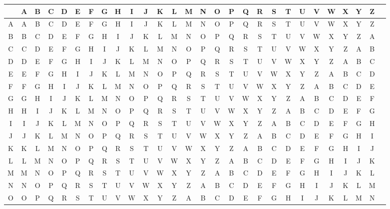 \documentclass[12pt]{article}
\begin{document}
\begin{figure}[ht]
\begin{adjustbox}{max width=\textwidth}
	\begin{tabular}{| c || c | c | c | c | c | c | c | c | c | c | c | c | c | c | c | c | c | c | c | c | c | c | c | c | c | c | c |}
		\hline
		 & A & B & C & D & E & F & G & H & I & J & K & L & M & N & O & P & Q & R & S & T & U & V & W & X & Y & Z \\
		\hline\hline
A & A & B & C & D & E & F & G & H & I & J & K & L & M & N & O & P & Q & R & S & T & U & V & W & X & Y & Z \\ \hline
B & B & C & D & E & F & G & H & I & J & K & L & M & N & O & P & Q & R & S & T & U & V & W & X & Y & Z & A \\ \hline
C & C & D & E & F & G & H & I & J & K & L & M & N & O & P & Q & R & S & T & U & V & W & X & Y & Z & A & B \\ \hline
D & D & E & F & G & H & I & J & K & L & M & N & O & P & Q & R & S & T & U & V & W & X & Y & Z & A & B & C \\ \hline
E & E & F & G & H & I & J & K & L & M & N & O & P & Q & R & S & T & U & V & W & X & Y & Z & A & B & C & D \\ \hline
F & F & G & H & I & J & K & L & M & N & O & P & Q & R & S & T & U & V & W & X & Y & Z & A & B & C & D & E \\ \hline
G & G & H & I & J & K & L & M & N & O & P & Q & R & S & T & U & V & W & X & Y & Z & A & B & C & D & E & F \\ \hline
H & H & I & J & K & L & M & N & O & P & Q & R & S & T & U & V & W & X & Y & Z & A & B & C & D & E & F & G \\ \hline
I & I & J & K & L & M & N & O & P & Q & R & S & T & U & V & W & X & Y & Z & A & B & C & D & E & F & G & H \\ \hline
J & J & K & L & M & N & O & P & Q & R & S & T & U & V & W & X & Y & Z & A & B & C & D & E & F & G & H & I \\ \hline
K & K & L & M & N & O & P & Q & R & S & T & U & V & W & X & Y & Z & A & B & C & D & E & F & G & H & I & J \\ \hline
L & L & M & N & O & P & Q & R & S & T & U & V & W & X & Y & Z & A & B & C & D & E & F & G & H & I & J & K \\ \hline
M & M & N & O & P & Q & R & S & T & U & V & W & X & Y & Z & A & B & C & D & E & F & G & H & I & J & K & L \\ \hline
N & N & O & P & Q & R & S & T & U & V & W & X & Y & Z & A & B & C & D & E & F & G & H & I & J & K & L & M \\ \hline
O & O & P & Q & R & S & T & U & V & W & X & Y & Z & A & B & C & D & E & F & G & H & I & J & K & L & M & N \\ \hline

\end{tabular}
\end{adjustbox}
\end{figure}
\end{document}

